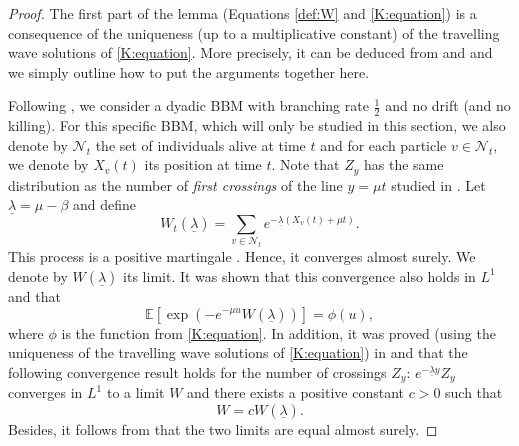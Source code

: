 \documentclass[11pt]{article}
\theoremstyle{plain}
\begin{document}
\begin{proof} The first part of the lemma (Equations \eqref{def:W} and \eqref{K:equation}) is a consequence of the uniqueness (up to a multiplicative constant) of the travelling wave solutions of \eqref{K:equation}. More precisely, it can be deduced from \cite{Chauvin:1991uw} and \cite{Neveu:1988aa} and we simply outline how to put the arguments together  here. %

Following \cite{Neveu:1988aa}, we consider a  dyadic BBM with branching rate $\frac{1}{2}$ and no drift (and no killing). For this specific BBM, which will only be studied in this section, we also denote by $\mathcal{N}_t$ the set of individuals alive at time $t$ and for each particle $v\in \mathcal{N}_t$,  we denote by $X_v(t)$ its position at time $t$. Note that $Z_y$ has the same distribution as the number of \textit{first crossings} of the line $y=\mu t$ studied in \cite{Neveu:1988aa}. Let $\underline{\lambda}=\mu-\beta$ and define
\begin{equation*}
W_t(\underline{\lambda})=\sum_{v\in\mathcal{N}_t}e^{-\underline{\lambda}(X_v(t)+\mu t)}.
\end{equation*} 
This process is a positive martingale \cite{Neveu:1988aa}. Hence, it converges almost surely. We denote by $W(\underline{\lambda})$ its limit. It was shown \cite{Neveu:1988aa} that this convergence also holds in $L^1$ and that  
\begin{equation*}
 \mathbb{E}\left[\exp\left(-e^{-\mu u}W(\underline{\lambda})\right)\right]=\phi(u),
\end{equation*}
where $\phi$ is the function from \eqref{K:equation}.
In addition, it was proved (using the uniqueness of the travelling wave solutions of \eqref{K:equation}) in  \cite{Chauvin:1991uw} and \cite{Neveu:1988aa} that the following convergence result holds for the number of crossings $Z_y$:  $e^{-\underline{\lambda}y}Z_y$ converges in $L^1$ to a limit $W$ and there exists a positive constant $c>0$ such that 
\begin{equation*}
W=cW(\underline\lambda).
\end{equation*}
Besides, it follows from \cite{Chauvin:1991uw} that the two limits are equal almost surely. 



\end{proof}
\end{document}
